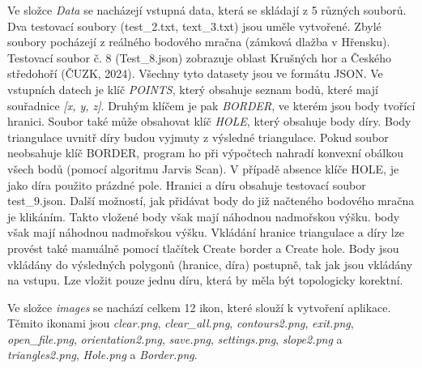\documentclass{article}
\begin{document}
\begin{spacing}{1.5}
Ve složce \textit{Data} se nacházejí vstupná data, která se skládají z 5 různých souborů. Dva testovací soubory (test\_2.txt, text\_3.txt) jsou uměle vytvořené. Zbylé soubory pocházejí z reálného bodového mračna (zámková dlažba v Hřensku). Testovací soubor č. 8 (Test\_8.json) zobrazuje oblast Krušných hor a Českého středohoří (ČUZK, 2024). Všechny tyto datasety jsou ve formátu JSON. Ve vstupních datech je klíč \textit{POINTS}, který obsahuje seznam bodů, které mají souřadnice \textit{[x, y, z]}. Druhým klíčem je pak \textit{BORDER}, ve kterém jsou body tvořící hranici. Soubor také může obsahovat klíč \textit{HOLE}, který obsahuje body díry. Body triangulace uvnitř díry budou vyjmuty z výsledné triangulace. Pokud soubor neobsahuje klíč BORDER, program ho při výpočtech nahradí konvexní obálkou všech bodů (pomocí algoritmu Jarvis Scan). V případě absence klíče HOLE, je jako díra použito prázdné pole. Hranici a díru obsahuje testovací soubor test\_9.json. Další možností, jak přidávat body do již načteného bodového mračna je klikáním. Takto vložené body však mají náhodnou nadmořskou výšku.
body však mají náhodnou nadmořskou výšku.
Vkládání hranice triangulace a díry lze provést také manuálně pomocí tlačítek Create border a Create hole. Body jsou vkládány do výsledných polygonů (hranice, díra) postupně, tak jak jsou vkládány na vstupu. Lze vložit pouze jednu díru, která by měla být topologicky korektní. 

Ve složce \textit{images} se nachází celkem 12 ikon, které slouží k vytvoření aplikace. Těmito ikonami jsou \textit{clear.png}, \textit{clear\_all.png}, \textit{contours2.png}, \textit{exit.png}, \textit{open\_file.png}, \textit{orientation2.png}, \textit{save.png}, \textit{settings.png}, \textit{slope2.png} a \textit{triangles2.png}, \textit{Hole.png} a \textit{Border.png}.


\end{spacing}
\end{document}
